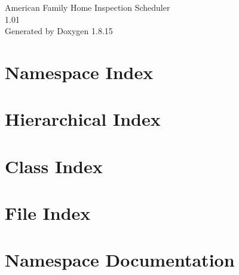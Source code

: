 \let\mypdfximage\pdfximage\def\pdfximage{\immediate\mypdfximage}\documentclass[twoside]{book}
\newcommand{\+}{\discretionary{\mbox{\scriptsize$\hookleftarrow$}}{}{}}
\newcommand{\clearemptydoublepage}{%
  \newpage{\pagestyle{empty}\cleardoublepage}%
}
\begin{document}
\begin{titlepage}
\vspace*{7cm}
\begin{center}%
{\Large American Family Home Inspection Scheduler \\[1ex]\large 1.\+01 }\\
\vspace*{1cm}
{\large Generated by Doxygen 1.8.15}\\
\end{center}
\end{titlepage}
\clearemptydoublepage
{}
\tableofcontents
\clearemptydoublepage
{}

\chapter{Namespace Index}

\chapter{Hierarchical Index}

\chapter{Class Index}

\chapter{File Index}

\chapter{Namespace Documentation}






















\end{document}
